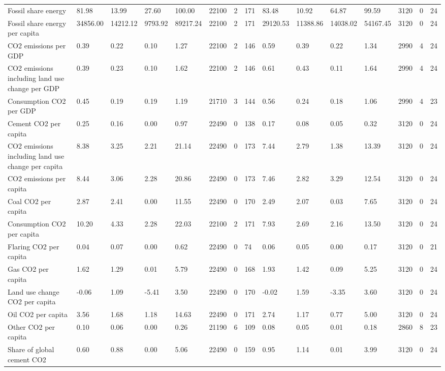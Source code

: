 \begin{longtable}{lllllllllllllll}
Fossil share energy & 81.98 & 13.99 & 27.60 & 100.00 & 22100 & 2 & 171 & 83.48 & 10.92 & 64.87 & 99.59 & 3120 & 0 & 24\\
Fossil share energy per capita & 34856.00 & 14212.12 & 9793.92 & 89217.24 & 22100 & 2 & 171 & 29120.53 & 11388.86 & 14038.02 & 54167.45 & 3120 & 0 & 24\\
CO2 emissions per GDP & 0.39 & 0.22 & 0.10 & 1.27 & 22100 & 2 & 146 & 0.59 & 0.39 & 0.22 & 1.34 & 2990 & 4 & 24\\
CO2 emissions including land use change per GDP & 0.39 & 0.23 & 0.10 & 1.62 & 22100 & 2 & 146 & 0.61 & 0.43 & 0.11 & 1.64 & 2990 & 4 & 24\\
\addlinespace
Consumption CO2 per GDP & 0.45 & 0.19 & 0.19 & 1.19 & 21710 & 3 & 144 & 0.56 & 0.24 & 0.18 & 1.06 & 2990 & 4 & 23\\
Cement CO2 per capita & 0.25 & 0.16 & 0.00 & 0.97 & 22490 & 0 & 138 & 0.17 & 0.08 & 0.05 & 0.32 & 3120 & 0 & 24\\
CO2 emissions including land use change per capita & 8.38 & 3.25 & 2.21 & 21.14 & 22490 & 0 & 173 & 7.44 & 2.79 & 1.38 & 13.39 & 3120 & 0 & 24\\
CO2 emissions per capita & 8.44 & 3.06 & 2.28 & 20.86 & 22490 & 0 & 173 & 7.46 & 2.82 & 3.29 & 12.54 & 3120 & 0 & 24\\
Coal CO2 per capita & 2.87 & 2.41 & 0.00 & 11.55 & 22490 & 0 & 170 & 2.49 & 2.07 & 0.03 & 7.65 & 3120 & 0 & 24\\
\addlinespace
Consumption CO2 per capita & 10.20 & 4.33 & 2.28 & 22.03 & 22100 & 2 & 171 & 7.93 & 2.69 & 2.16 & 13.50 & 3120 & 0 & 24\\
Flaring CO2 per capita & 0.04 & 0.07 & 0.00 & 0.62 & 22490 & 0 & 74 & 0.06 & 0.05 & 0.00 & 0.17 & 3120 & 0 & 21\\
Gas CO2 per capita & 1.62 & 1.29 & 0.01 & 5.79 & 22490 & 0 & 168 & 1.93 & 1.42 & 0.09 & 5.25 & 3120 & 0 & 24\\
Land use change CO2 per capita & -0.06 & 1.09 & -5.41 & 3.50 & 22490 & 0 & 170 & -0.02 & 1.59 & -3.35 & 3.60 & 3120 & 0 & 24\\
Oil CO2 per capita & 3.56 & 1.68 & 1.18 & 14.63 & 22490 & 0 & 171 & 2.74 & 1.17 & 0.77 & 5.00 & 3120 & 0 & 24\\
\addlinespace
Other CO2 per capita & 0.10 & 0.06 & 0.00 & 0.26 & 21190 & 6 & 109 & 0.08 & 0.05 & 0.01 & 0.18 & 2860 & 8 & 23\\
Share of global cement CO2 & 0.60 & 0.88 & 0.00 & 5.06 & 22490 & 0 & 159 & 0.95 & 1.14 & 0.01 & 3.99 & 3120 & 0 & 24\\

\end{longtable}
